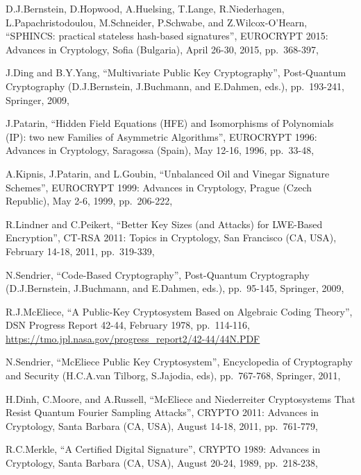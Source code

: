 \documentclass[a4paper,12pt]{article}
\begin{document}
\begin{thebibliography}{99}
D.J.Bernstein, D.Hopwood, A.Huelsing, T.Lange, R.Niederhagen, L.Papachristodoulou, M.Schneider, P.Schwabe, and Z.Wilcox-O'Hearn,
``SPHINCS: practical stateless hash-based signatures'',
EUROCRYPT 2015: Advances in Cryptology,
Sofia (Bulgaria),
April 26-30, 2015,
pp.~368-397,

J.Ding and B.Y.Yang,
``Multivariate Public Key Cryptography'',
Post-Quantum Cryptography (D.J.Bernstein, J.Buchmann, and E.Dahmen, eds.),
pp.~193-241,
Springer,
2009,

J.Patarin,
``Hidden Field Equations (HFE) and Isomorphisms of Polynomials (IP): two new Families of Asymmetric Algorithms'',
EUROCRYPT 1996: Advances in Cryptology,
Saragossa (Spain),
May 12-16, 1996,
pp.~33-48,

A.Kipnis, J.Patarin, and L.Goubin,
``Unbalanced Oil and Vinegar Signature Schemes'',
EUROCRYPT 1999: Advances in Cryptology, 
Prague (Czech Republic),
May 2-6, 1999,
pp.~206-222,

R.Lindner and C.Peikert,
``Better Key Sizes (and Attacks) for LWE-Based Encryption'',
CT-RSA 2011: Topics in Cryptology,
San Francisco (CA, USA),
February 14-18, 2011,
pp.~319-339,

N.Sendrier,
``Code-Based Cryptography'',
Post-Quantum Cryptography (D.J.Bernstein, J.Buchmann, and E.Dahmen, eds.),
pp.~95-145,
Springer,
2009,

R.J.McEliece,
``A Public-Key Cryptosystem Based on Algebraic Coding Theory'',
DSN Progress Report 42-44,
February 1978,
pp.~114-116,
\url{https://tmo.jpl.nasa.gov/progress_report2/42-44/44N.PDF}

N.Sendrier,
``McEliece Public Key Cryptosystem'',
Encyclopedia of Cryptography and Security (H.C.A.van Tilborg, S.Jajodia, eds),
pp.~767-768,
Springer,
2011,

H.Dinh, C.Moore, and A.Russell,
``McEliece and Niederreiter Cryptosystems That Resist Quantum Fourier Sampling Attacks'',
CRYPTO 2011: Advances in Cryptology,
Santa Barbara (CA, USA),
August 14-18, 2011,
pp.~761-779,

R.C.Merkle,
``A Certified Digital Signature'',
CRYPTO 1989: Advances in Cryptology,
Santa Barbara (CA, USA),
August 20-24, 1989,
pp.~218-238,


\end{thebibliography}
\end{document}
